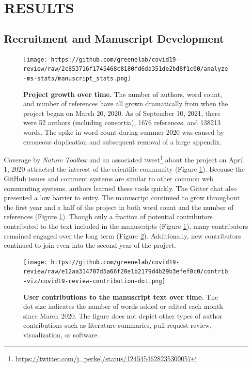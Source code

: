 \documentclass[twocolumn]{ceurart}
\begin{document}
\hypertarget{results}{%
\section{RESULTS}\label{results}}

\hypertarget{recruitment-and-manuscript-development}{%
\subsection{Recruitment and Manuscript Development}\label{recruitment-and-manuscript-development}}

\begin{figure}
\hypertarget{fig:projectstats}{%
\centering
\texttt{[image: https://github.com/greenelab/covid19-review/raw/2c853716f1745468c8180fd6da351de2bd8f1c00/analyze-ms-stats/manuscript\_stats.png]}
\caption{\textbf{Project growth over time.}
The number of authors, word count, and number of references have all grown dramatically from when the project began on March 20, 2020.
As of September 10, 2021, there were 52 authors (including consortia), 1676 references, and 138213 words.
The spike in word count during summer 2020 was caused by erroneous duplication and subsequent removal of a large appendix.}\label{fig:projectstats}
}
\end{figure}

Coverage by \emph{Nature Toolbox} \citep{AE0QcVgJ} and an associated tweet\footnote{\url{https://twitter.com/j_perkel/status/1245454628235309057}} about the project on April 1, 2020 attracted the interest of the scientific community (Figure \ref{fig:projectstats}).
Because the GitHub issues and comment systems are similar to other common web commenting systems, authors learned these tools quickly.
The Gitter chat also presented a low barrier to entry.
The manuscript continued to grow throughout the first year and a half of the project in both word count and the number of references (Figure \ref{fig:projectstats}).
Though only a fraction of potential contributors contributed to the text included in the manuscripts (Figure \ref{fig:projectstats}), many contributors remained engaged over the long term (Figure \ref{fig:projectdots}).
Additionally, new contributors continued to join even into the second year of the project.

\begin{figure}
\hypertarget{fig:projectdots}{%
\centering
\texttt{[image: https://github.com/greenelab/covid19-review/raw/e12aa314707d5a66f20e1b2179d4b29b3efef0c0/contrib-viz/covid19-review-contribution-dot.png]}
\caption{\textbf{User contributions to the manuscript text over time.}
The dot size indicates the number of words added or edited each month since March 2020.
The figure does not depict other types of author contributions such as literature summaries, pull request review, visualization, or software.}\label{fig:projectdots}
}
\end{figure}
\end{document}
